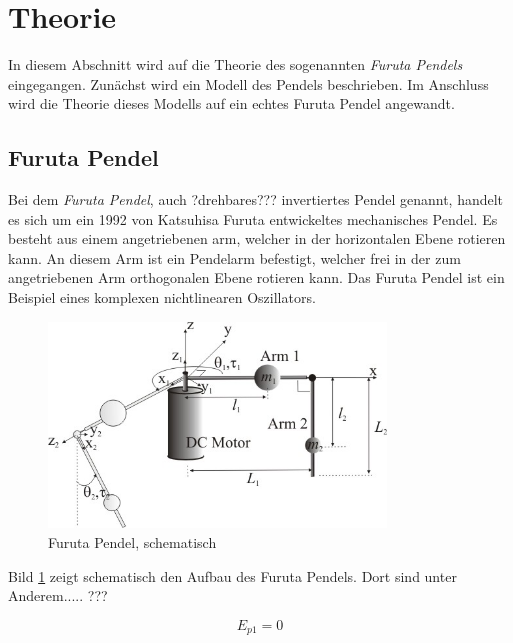 \section{Theorie}
\label{sec.Theorie}
In diesem Abschnitt wird auf die Theorie des sogenannten \emph{Furuta Pendels} eingegangen. Zunächst wird ein Modell des Pendels beschrieben. Im Anschluss wird die Theorie dieses Modells auf ein echtes Furuta Pendel angewandt. %

\subsection{Furuta Pendel}
\label{sub.Furuta-Pendel}
Bei dem \emph{Furuta Pendel}, auch ?drehbares??? invertiertes Pendel genannt, handelt es sich um ein 1992 von Katsuhisa Furuta entwickeltes mechanisches Pendel. 
Es besteht aus einem angetriebenen arm, welcher in der horizontalen Ebene rotieren kann. 
An diesem Arm ist ein Pendelarm befestigt, welcher frei in der zum angetriebenen Arm orthogonalen Ebene rotieren kann. 
Das Furuta Pendel ist ein Beispiel eines komplexen nichtlinearen Oszillators. \citet{Cazzolato.2011}


\begin{figure}[htbp]
	\label{fig.furuta-schematic}
	\includegraphics[width=0.8\textwidth]{Grafiken/furuta.jpg}
	\caption{Furuta Pendel, schematisch \cite{Cazzolato.2011} }
\end{figure}

Bild \ref{fig.furuta-schematic} zeigt schematisch den Aufbau des Furuta Pendels.
Dort sind unter Anderem..... ??? %


\begin{equation}
 E_{p1} = 0
\end{equation}

